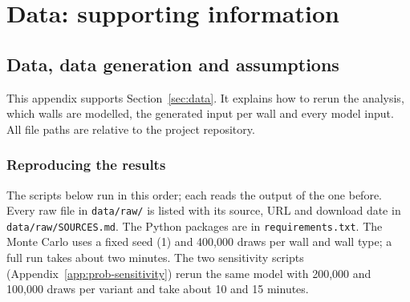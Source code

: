 \chapter{Data: supporting information}
\label{app:data-chapter}


\section{Data, data generation and assumptions}\label{app:data}

This appendix supports Section~\ref{sec:data}. It explains how to rerun the
analysis, which walls are modelled, the generated input per wall and every
model input. All file paths are
relative to the project repository.

\subsection{Reproducing the results}\label{app:data-run}

The scripts below run in this order; each reads the output of the one before.
Every raw file in \texttt{data/raw/} is listed with its source, URL and
download date in \texttt{data/raw/SOURCES.md}. The Python packages are in
\texttt{requirements.txt}. The Monte Carlo uses a fixed seed (1) and
400{,}000 draws per wall and wall type; a full run takes about two minutes.
The two sensitivity scripts (Appendix~\ref{app:prob-sensitivity}) rerun the
same model with 200{,}000 and 100{,}000 draws per variant and take about
10 and 15 minutes.

